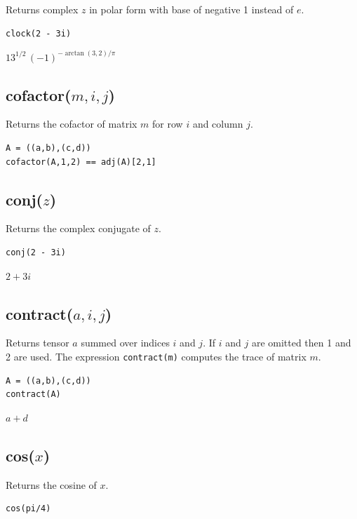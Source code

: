 \documentclass[12pt]{article}
\begin{document}
Returns complex $z$ in polar form with base of negative 1 instead of $e$.

{\color{blue}
\begin{verbatim}
clock(2 - 3i)
\end{verbatim}
}

\noindent
$13^{1/2}\,(-1)^{-\arctan(3,2)/\pi}$

\subsection*{cofactor($m,i,j$)}

Returns the cofactor of matrix $m$ for row $i$ and column $j$.

{\color{blue}
\begin{verbatim}
A = ((a,b),(c,d))
cofactor(A,1,2) == adj(A)[2,1]
\end{verbatim}
}


\subsection*{conj($z$)}

Returns the complex conjugate of $z$.

{\color{blue}
\begin{verbatim}
conj(2 - 3i)
\end{verbatim}
}

\noindent
$2 + 3 i$

\subsection*{contract($a,i,j$)}

Returns tensor $a$ summed over indices $i$ and $j$.
If $i$ and $j$ are omitted then 1 and 2 are used.
The expression {\tt contract(m)} computes the trace of matrix $m$.

{\color{blue}
\begin{verbatim}
A = ((a,b),(c,d))
contract(A)
\end{verbatim}
}

\noindent
$a + d$

\subsection*{cos($x$)}

Returns the cosine of $x$.

{\color{blue}
\begin{verbatim}
cos(pi/4)
\end{verbatim}
}
\end{document}
